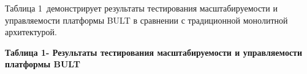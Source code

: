 {Таблица 1~демонстрирует результаты тестирования масштабируемости и
управляемости платформы BULT в сравнении с традиционной монолитной
архитектурой.

{\bfseries Таблица 1- Результаты тестирования масштабируемости и
управляемости платформы BULT}

}
